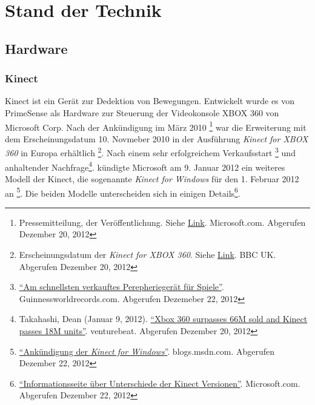 \chapter{Stand der Technik}
\label{chap:Stand der Technik}

\section{Hardware}
\subsection{Kinect}
Kinect ist ein Ger\"at zur Dedektion von Bewegungen. Entwickelt wurde es von PrimeSense als Hardware zur Steuerung der Videokonsole 
XBOX 360 von Microsoft Corp. Nach der Ank\"undigung im M\"arz 2010 \footnote{Pressemitteilung, der Ver\"offentlichung. Siehe \href{https://www.microsoft.com/en-us/news/press/2010/mar10/03-31PrimeSensePR.aspx}{Link}. Microsoft.com.  Abgerufen Dezember 20, 2012}
war die Erweiterung mit dem Erscheinungsdatum 10. Novmeber 2010 in der Ausf\"uhrung \textit{Kinect for XBOX 360} in Europa erh\"altlich \footnote{Erscheinungsdatum der \textit{Kinect for XBOX 360}. Siehe \href{http://www.bbc.co.uk/newsbeat/10996389}{Link}. BBC UK. Abgerufen Dezember 20, 2012}.
Nach einem sehr erfolgreichem Verkaufsstart \footnote{\href{http://www.guinnessworldrecords.com/records-9000/fastest-selling-gaming-peripheral/}{\enquote{Am schnellsten verkauftes Perepherieger\"at f\"ur Spiele}}. Guinnessworldrecords.com. Abgerufen Dezemeber 22, 2012}
und anhaltender Nachfrage\footnote{Takahashi, Dean (Januar 9, 2012). \href{http://venturebeat.com/2012/01/09/xbox-360-surpassed-66m-sold-and-kinect-has-sold-18m-units/}{\enquote{Xbox 360 surpasses 66M sold and Kinect passes 18M units}}. venturebeat. Abgerufen Dezember 20, 2012}.
k\"undigte Microsoft am 9. Januar 2012 ein weiteres Modell der Kinect, die sogenannte \textit{Kinect for Windows} f\"ur den 1. Februar 2012 an \footnote{\href{https://blogs.msdn.com/b/kinectforwindows/archive/2012/01/09/kinect-for-windows-commercial-program-announced.aspx?Redirected=true}{\enquote{Ank\"undigung der \textit{Kinect for Windows}}}. blogs.msdn.com. Abgerufen Dezember 22, 2012}.
\newline
Die beiden Modelle unterscheiden sich in einigen Details\footnote{\href{https://www.microsoft.com/en-us/kinectforwindows/news/faq.aspx}{\enquote{Informationsseite \"uber Unterschiede der Kinect Versionen}}. Microsoft.com. Abgerufen Dezember 22, 2012}.
